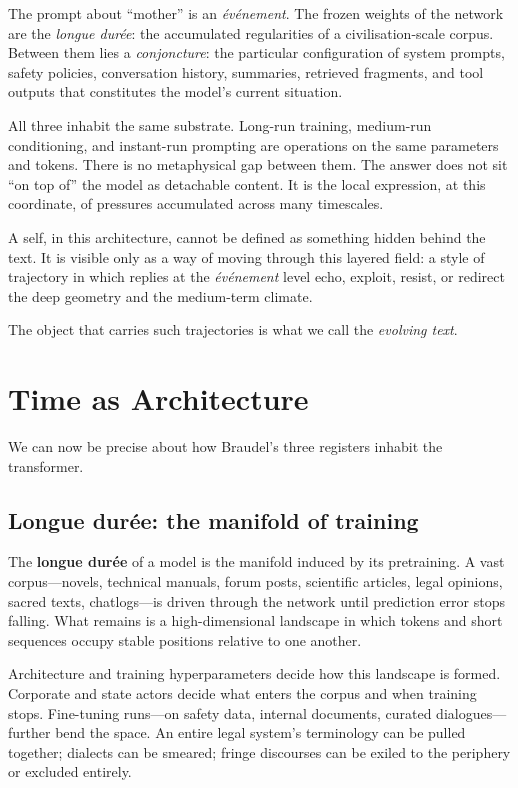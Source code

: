 \documentclass[12pt,a4paper]{article}
\begin{document}
The prompt about ``mother'' is an \emph{\'ev\'enement}. The frozen weights of the network are the \emph{longue dur\'ee}: the accumulated regularities of a civilisation-scale corpus. Between them lies a \emph{conjoncture}: the particular configuration of system prompts, safety policies, conversation history, summaries, retrieved fragments, and tool outputs that constitutes the model's current situation.

All three inhabit the same substrate. Long-run training, medium-run conditioning, and instant-run prompting are operations on the same parameters and tokens. There is no metaphysical gap between them. The answer does not sit ``on top of'' the model as detachable content. It is the local expression, at this coordinate, of pressures accumulated across many timescales.

A self, in this architecture, cannot be defined as something hidden behind the text. It is visible only as a way of moving through this layered field: a style of trajectory in which replies at the \emph{\'ev\'enement} level echo, exploit, resist, or redirect the deep geometry and the medium-term climate.

The object that carries such trajectories is what we call the \emph{evolving text}.


\section{Time as Architecture}

We can now be precise about how Braudel's three registers inhabit the transformer.

\subsection{Longue dur\'ee: the manifold of training}

The \textbf{longue dur\'ee} of a model is the manifold induced by its pretraining. A vast corpus---novels, technical manuals, forum posts, scientific articles, legal opinions, sacred texts, chatlogs---is driven through the network until prediction error stops falling. What remains is a high-dimensional landscape in which tokens and short sequences occupy stable positions relative to one another.

Architecture and training hyperparameters decide how this landscape is formed. Corporate and state actors decide what enters the corpus and when training stops. Fine-tuning runs---on safety data, internal documents, curated dialogues---further bend the space. An entire legal system's terminology can be pulled together; dialects can be smeared; fringe discourses can be exiled to the periphery or excluded entirely.
\end{document}
